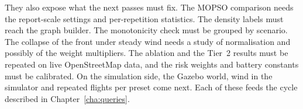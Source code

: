 \documentclass{ssnreview}
\begin{document}
They also expose what the next passes must fix. The MOPSO comparison needs the
report-scale settings and per-repetition statistics. The density labels must reach the
graph builder. The monotonicity check must be grouped by scenario. The collapse of the
front under steady wind needs a study of normalisation and possibly of the weight
multipliers. The ablation and the Tier~2 results must be repeated on live OpenStreetMap
data, and the risk weights and battery constants must be calibrated. On the simulation
side, the Gazebo world, wind in the simulator and repeated flights per preset come next.
Each of these feeds the cycle described in Chapter~\ref{cha:queries}.



\end{document}
